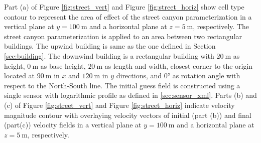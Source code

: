 Part (a) of Figure \ref{fig:street_vert} and Figure \ref{fig:street_horiz} show cell type contour to represent the area of effect of the street canyon parameterization in a vertical plane at $y=100\ \si{\meter}$ and a horizontal plane at $z=5\ \si{\meter}$, respectively. The street canyon parameterization is applied to an area between two rectangular buildings. The upwind building is same as the one defined in Section \ref{sec:building}. The downwind building is a rectangular building with $20\ \si{\metre}$ as height, $0\ \si{\metre}$ as base height, $20\ \si{\metre}$ as length and width, closest corner to the origin located at $90\ \si{\metre}$ in $x$ and $120\ \si{\metre}$ in $y$ directions, and $0\si{\degree}$ as rotation angle with respect to the North-South line. The initial guess field is constructed using a single sensor with logarithmic profile as defined in \ref{sec:sensor_xml}. Parts (b) and (c) of Figure \ref{fig:street_vert} and Figure \ref{fig:street_horiz} indicate velocity magnitude contour with overlaying velocity vectors of initial (part (b)) and final (part(c)) velocity fields in a vertical plane at $y=100\ \si{\meter}$ and a horizontal plane at $z=5\ \si{\meter}$, respectively.

